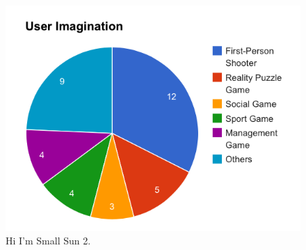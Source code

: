 \begin{figure}[!t]
\centering
\includegraphics[width=0.9\columnwidth]{Figures/US1_userImaginationStatistics.png}
\caption{Hi I'm Small Sun 2.}
\label{fig:US1_TypesOfGame}
\end{figure}
